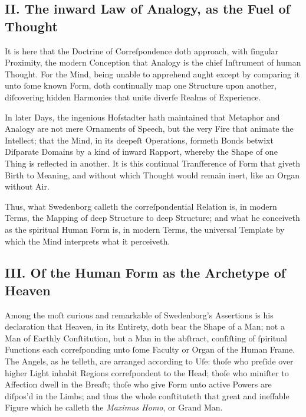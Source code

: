 \documentclass[12pt]{article}
\begin{document}
\subsection*{II. The inward Law of Analogy, as the Fuel of Thought}

It is here that the Doctrine of Correſpondence doth approach, with ſingular 
Proximity, the modern Conception that Analogy is the chief Inſtrument of human 
Thought. For the Mind, being unable to apprehend aught except by comparing it 
unto ſome known Form, doth continually map one Structure upon another, 
diſcovering hidden Harmonies that unite diverſe Realms of Experience.

In later Days, the ingenious Hofstadter hath maintained that Metaphor and 
Analogy are not mere Ornaments of Speech, but the very Fire that animate the 
Intellect; that the Mind, in its deepeſt Operations, formeth Bonds betwixt 
Diſparate Domains by a kind of inward Rapport, whereby the Shape of one Thing 
is reflected in another. It is this continual Tranſference of Form that giveth 
Birth to Meaning, and without which Thought would remain inert, like an Organ 
without Air.

Thus, what Swedenborg calleth the correſpondential Relation is, in modern 
Terms, the Mapping of deep Structure to deep Structure; and what he 
conceiveth as the spiritual Human Form is, in modern Terms, the universal 
Template by which the Mind interprets what it perceiveth.

\subsection*{III. Of the Human Form as the Archetype of Heaven}

Among the moſt curious and remarkable of Swedenborg’s Assertions is his 
declaration that Heaven, in its Entirety, doth bear the Shape of a Man; not a 
Man of Earthly Conſtitution, but a Man in the abſtract, conſiſting of ſpiritual 
Functions each correſponding unto ſome Faculty or Organ of the Human Frame. 
The Angels, as he telleth, are arranged according to Uſe: thoſe who preſide 
over higher Light inhabit Regions correſpondent to the Head; thoſe who 
miniſter to Affection dwell in the Breaſt; thoſe who give Form unto active 
Powers are diſpos’d in the Limbs; and thus the whole conſtituteth that great 
and ineffable Figure which he calleth the \textit{Maximus Homo}, or Grand Man.
\end{document}

